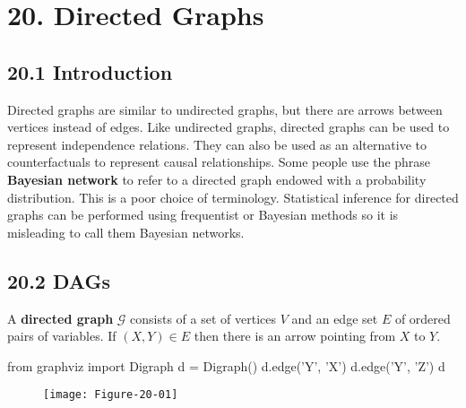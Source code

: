 \section*{20. Directed Graphs}\label{directed-graphs}

\subsection*{20.1 Introduction}\label{introduction:graphs}
Directed graphs are similar to undirected graphs, but there are arrows
between vertices instead of edges. Like undirected graphs, directed
graphs can be used to represent independence relations. They can also be
used as an alternative to counterfactuals to represent causal
relationships. Some people use the phrase \textbf{Bayesian network} to
refer to a directed graph endowed with a probability distribution. This
is a poor choice of terminology. Statistical inference for directed
graphs can be performed using frequentist or Bayesian methods so it is
misleading to call them Bayesian networks.

\subsection*{20.2 DAGs}\label{dags}
A \textbf{directed graph} \(\mathcal{G}\) consists of a set of vertices
\(V\) and an edge set \(E\) of ordered pairs of variables. If
\((X, Y) \in E\) then there is an arrow pointing from \(X\) to \(Y\).

\begin{python}
from graphviz import Digraph
d = Digraph()
d.edge('Y', 'X')
d.edge('Y', 'Z')
d
\end{python}

\begin{figure}[H]
\centering
\texttt{[image: Figure-20-01]}
\end{figure}

